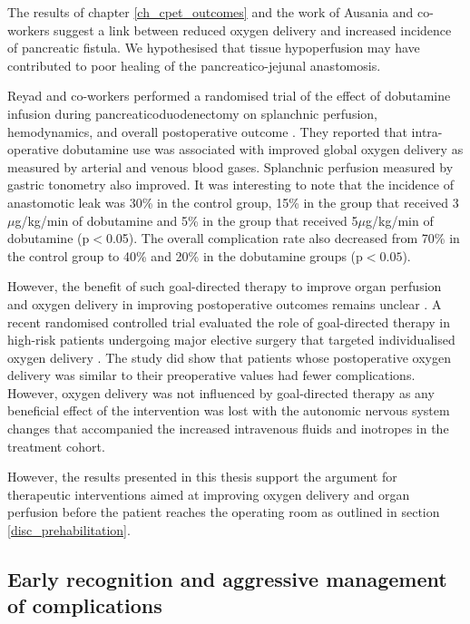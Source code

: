 The results of chapter \ref{ch_cpet_outcomes} and the work of Ausania and co-workers \parencite{ausania_effects_2012} suggest a link between reduced oxygen delivery and increased incidence of pancreatic fistula. 
We hypothesised that tissue hypoperfusion may have contributed to poor healing of the pancreatico-jejunal anastomosis. 

Reyad and co-workers performed a randomised trial of the effect of dobutamine infusion during pancreaticoduodenectomy on splanchnic perfusion, hemodynamics, and overall postoperative outcome \parencite{reyad_effect_2013}. 
They reported that intra-operative dobutamine use was associated with improved global oxygen delivery as measured by arterial and venous blood gases. 
Splanchnic perfusion measured by gastric tonometry also improved.
It was interesting to note that the incidence of anastomotic leak was 30\% in the control group, 15\% in the group that received 3$\mu$g/kg/min of dobutamine and 5\% in the group that received 5$\mu$g/kg/min of dobutamine (p$<$0.05). 
The overall complication rate also decreased from 70\% in the control group to 40\% and 20\% in the dobutamine groups (p$<0.05$).

However, the benefit of such goal-directed therapy to improve organ perfusion and oxygen delivery in improving postoperative outcomes remains unclear \parencite{grocott_perioperative_2013, pearse_effect_2014}. 
A recent randomised controlled trial evaluated the role of goal-directed therapy in high-risk patients undergoing major elective surgery that targeted individualised oxygen delivery \parencite{ackland_individualised_2015}.
The study did show that patients whose postoperative oxygen delivery was similar to their preoperative values had fewer complications.
However, oxygen delivery was not influenced by goal-directed therapy as any beneficial effect of the intervention was lost with the autonomic nervous system changes that accompanied the increased intravenous fluids and inotropes in the treatment cohort.

However, the results presented in this thesis support the argument for therapeutic interventions aimed at improving oxygen delivery and organ perfusion before the patient reaches the operating room as outlined in section \ref{disc_prehabilitation}.

\subsection{Early recognition and aggressive management of complications}


